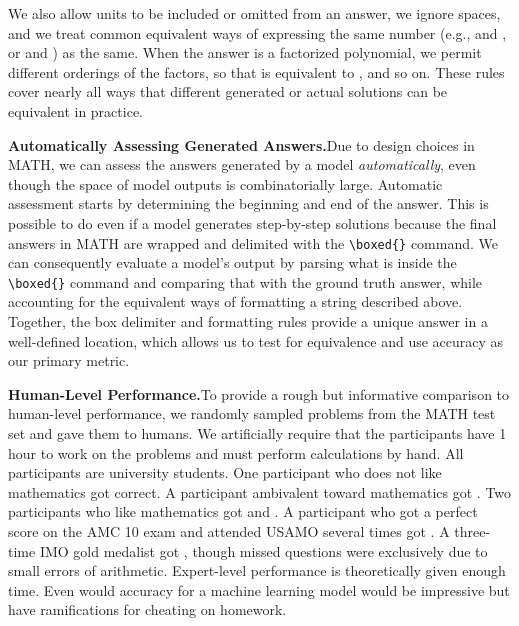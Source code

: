 \documentclass{article}
\begin{document}
We also allow units to be included or omitted from an answer, we ignore spaces, and we treat common equivalent ways of expressing the same number (e.g.,  and , or  and ) as the same. When the answer is a factorized polynomial, we permit different orderings of the factors, so that  is equivalent to , and so on. These rules cover nearly all ways that different generated or actual solutions can be equivalent in practice. 


\textbf{Automatically Assessing Generated Answers.}\quad Due to design choices in MATH, we can assess the answers generated by a model \emph{automatically}, even though the space of model outputs is combinatorially large. Automatic assessment starts by determining the beginning and end of the answer. This is possible to do even if a model generates step-by-step solutions because the final answers in MATH are wrapped and delimited with the \verb|\boxed{}| command. We can consequently evaluate a model's output by parsing what is inside the \verb|\boxed{}| command and comparing that with the ground truth answer, while accounting for the equivalent ways of formatting a string described above.
Together, the box delimiter and formatting rules provide a unique answer in a well-defined location, which allows us to test for equivalence and use accuracy as our primary metric.

\textbf{Human-Level Performance.}\quad To provide a rough but informative comparison to human-level performance, we randomly sampled  problems from the MATH test set and gave them to humans. We artificially require that the participants have 1 hour to work on the problems and must perform calculations by hand. All participants are university students. One participant who does not like mathematics got  correct. A participant ambivalent toward mathematics got . Two participants who like mathematics got  and . A participant who got a perfect score on the AMC 10 exam and attended USAMO several times got . A three-time IMO gold medalist got , though missed questions were exclusively due to small errors of arithmetic. 
Expert-level performance is theoretically  given enough time. Even  would accuracy for a machine learning model would be impressive but have ramifications for cheating on homework.
\end{document}
